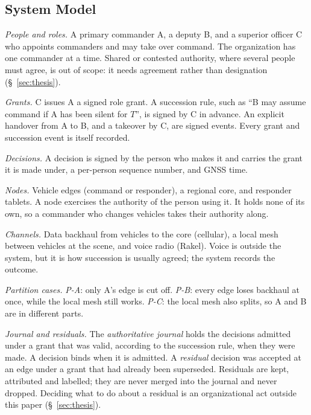 \subsection{System Model}
\label{sec:system-model}


\textit{People and roles.} A primary commander A, a deputy B, and a superior officer C who
appoints commanders and may take over command. The organization has one commander at a
time. Shared or contested authority, where several people must agree, is out of scope:
it needs agreement rather than designation (\S~\ref{sec:thesis}).

\textit{Grants.} C issues A a signed role grant. A succession rule, such as ``B may assume
command if A has been silent for $T$'', is signed by C in advance. An explicit handover
from A to B, and a takeover by C, are signed events. Every grant and succession event is
itself recorded.

\textit{Decisions.} A decision is signed by the person who makes it and carries the grant
it is made under, a per-person sequence number, and GNSS time.

\textit{Nodes.} Vehicle edges (command or responder), a regional core, and responder
tablets. A node exercises the authority of the person using it. It holds none of its own,
so a commander who changes vehicles takes their authority along.

\textit{Channels.} Data backhaul from vehicles to the core (cellular), a local mesh
between vehicles at the scene, and voice radio (Rakel). Voice is outside the system, but
it is how succession is usually agreed; the system records the outcome.

\textit{Partition cases.} \emph{P-A}: only A's edge is cut off. \emph{P-B}: every edge
loses backhaul at once, while the local mesh still works. \emph{P-C}: the local mesh also
splits, so A and B are in different parts.

\textit{Journal and residuals.} The \emph{authoritative journal} holds the decisions
admitted under a grant that was valid, according to the succession rule, when they were
made. A decision binds when it is admitted. A \emph{residual} decision was accepted at an
edge under a grant that had already been superseded. Residuals are kept, attributed and
labelled; they are never merged into the journal and never dropped. Deciding what to do
about a residual is an organizational act outside this paper (\S~\ref{sec:thesis}).

